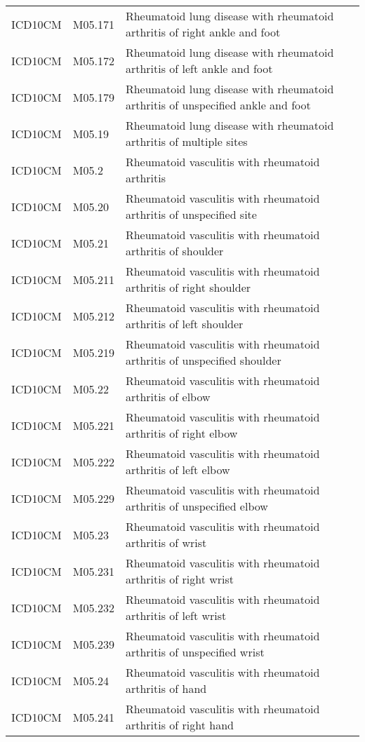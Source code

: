 \begin{table}[ht]
\begin{tabular}{lll}
  ICD10CM & M05.171 & Rheumatoid lung disease with rheumatoid arthritis of right ankle and foot \\ 
  ICD10CM & M05.172 & Rheumatoid lung disease with rheumatoid arthritis of left ankle and foot \\ 
  ICD10CM & M05.179 & Rheumatoid lung disease with rheumatoid arthritis of unspecified ankle and foot \\ 
  ICD10CM & M05.19 & Rheumatoid lung disease with rheumatoid arthritis of multiple sites \\ 
  ICD10CM & M05.2 & Rheumatoid vasculitis with rheumatoid arthritis \\ 
  ICD10CM & M05.20 & Rheumatoid vasculitis with rheumatoid arthritis of unspecified site \\ 
  ICD10CM & M05.21 & Rheumatoid vasculitis with rheumatoid arthritis of shoulder \\ 
  ICD10CM & M05.211 & Rheumatoid vasculitis with rheumatoid arthritis of right shoulder \\ 
  ICD10CM & M05.212 & Rheumatoid vasculitis with rheumatoid arthritis of left shoulder \\ 
  ICD10CM & M05.219 & Rheumatoid vasculitis with rheumatoid arthritis of unspecified shoulder \\ 
  ICD10CM & M05.22 & Rheumatoid vasculitis with rheumatoid arthritis of elbow \\ 
  ICD10CM & M05.221 & Rheumatoid vasculitis with rheumatoid arthritis of right elbow \\ 
  ICD10CM & M05.222 & Rheumatoid vasculitis with rheumatoid arthritis of left elbow \\ 
  ICD10CM & M05.229 & Rheumatoid vasculitis with rheumatoid arthritis of unspecified elbow \\ 
  ICD10CM & M05.23 & Rheumatoid vasculitis with rheumatoid arthritis of wrist \\ 
  ICD10CM & M05.231 & Rheumatoid vasculitis with rheumatoid arthritis of right wrist \\ 
  ICD10CM & M05.232 & Rheumatoid vasculitis with rheumatoid arthritis of left wrist \\ 
  ICD10CM & M05.239 & Rheumatoid vasculitis with rheumatoid arthritis of unspecified wrist \\ 
  ICD10CM & M05.24 & Rheumatoid vasculitis with rheumatoid arthritis of hand \\ 
  ICD10CM & M05.241 & Rheumatoid vasculitis with rheumatoid arthritis of right hand \\ 

\end{tabular}
\end{table}
